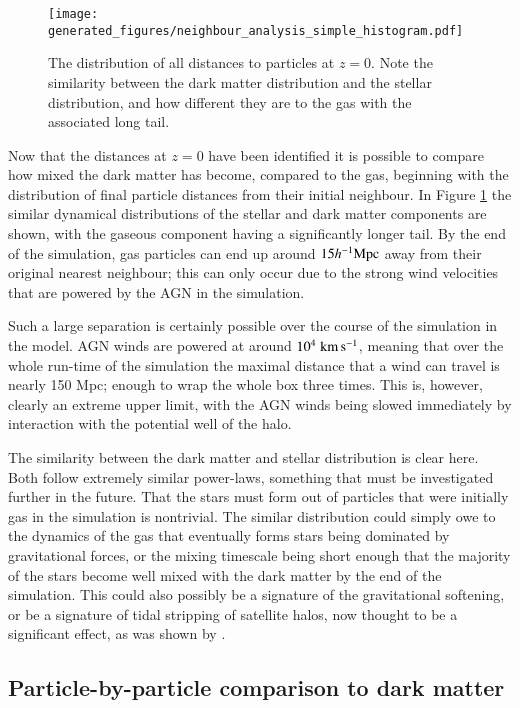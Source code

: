 \begin{figure} \centering
	\texttt{[image: generated\_figures/neighbour\_analysis\_simple\_histogram.pdf]}
	\caption{The distribution of all distances to particles at $z=0$. Note
	the similarity between the dark matter distribution and the stellar
	distribution, and how different they are to the gas with the associated
	long tail.} \label{fig:alldistances}
\end{figure}

Now that the distances at $z=0$ have been identified it is possible to
compare how mixed the dark matter has become, compared to the gas, beginning
with the distribution of final particle distances from their initial
neighbour. In Figure \ref{fig:alldistances} the similar dynamical
distributions of the stellar and dark matter components are shown, with the
gaseous component having a significantly longer tail. By the end of the
simulation, gas particles can end up around $15h^{-1}{\rm Mpc}{}$ away from their original
nearest neighbour; this can only occur due to the strong wind velocities that
are powered by the AGN in the simulation.

Such a large separation is certainly possible over the course of the
simulation in the \simba{} model. AGN winds are powered at around $10^4
\;{\rm km}\,{\rm s}^{-1}{}$, meaning that over the whole run-time of the simulation the maximal
distance that a wind can travel is nearly 150 Mpc; enough to wrap the whole
box three times. This is, however, clearly an extreme upper limit, with the
AGN winds being slowed immediately by interaction with the potential well of
the halo.

The similarity between the dark matter and stellar distribution is clear
here. Both follow extremely similar power-laws, something that must be
investigated further in the future. That the stars must form out of particles
that were initially gas in the simulation is nontrivial. The similar
distribution could simply owe to the dynamics of the gas that eventually
forms stars being dominated by gravitational forces, or the mixing timescale
being short enough that the majority of the stars become well mixed with the
dark matter by the end of the simulation. This could also possibly be a
signature of the gravitational softening, or be a signature of tidal
stripping of satellite halos, now thought to be a significant effect, as was
shown by \citet{vandenbosch2018}.

\subsection{Particle-by-particle comparison to dark matter}

